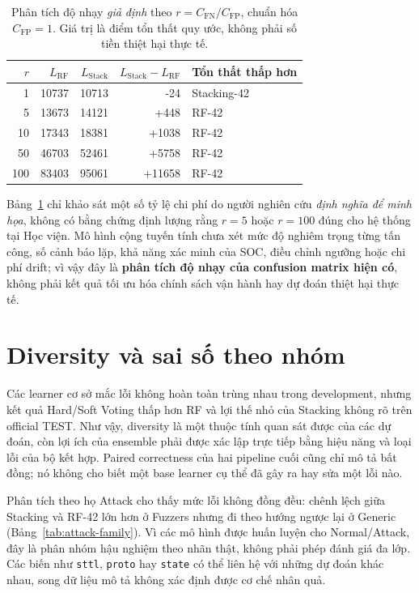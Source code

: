 \begin{table}[htbp]\centering\small
\renewcommand{\arraystretch}{1.23}
\caption{Phân tích độ nhạy \emph{giả định} theo $r=C_{\mathrm{FN}}/C_{\mathrm{FP}}$, chuẩn hóa $C_{\mathrm{FP}}=1$. Giá trị là điểm tổn thất quy ước, không phải số tiền thiệt hại thực tế.}
\label{tab:v4-cost-sensitivity}
\begin{tabular}{rrrrl}\toprule
$r$ & $L_{\mathrm{RF}}$ & $L_{\mathrm{Stack}}$ & $L_{\mathrm{Stack}}-L_{\mathrm{RF}}$ & Tổn thất thấp hơn\\\midrule
1 & 10737 & 10713 & -24 & Stacking-42\\
5 & 13673 & 14121 & +448 & RF-42\\
10 & 17343 & 18381 & +1038 & RF-42\\
50 & 46703 & 52461 & +5758 & RF-42\\
100 & 83403 & 95061 & +11658 & RF-42\\\bottomrule
\end{tabular}
\end{table}

Bảng~\ref{tab:v4-cost-sensitivity} chỉ khảo sát một số tỷ lệ chi phí do người nghiên cứu \emph{định nghĩa để minh họa}, không có bằng chứng định lượng rằng $r=5$ hoặc $r=100$ đúng cho hệ thống tại Học viện. Mô hình cộng tuyến tính chưa xét mức độ nghiêm trọng từng tấn công, số cảnh báo lặp, khả năng xác minh của SOC, điều chỉnh ngưỡng hoặc chi phí drift; vì vậy đây là \textbf{phân tích độ nhạy của confusion matrix hiện có}, không phải kết quả tối ưu hóa chính sách vận hành hay dự đoán thiệt hại thực tế.


\section{Diversity và sai số theo nhóm}
\label{sec:discussion-diversity-families}

Các learner cơ sở mắc lỗi không hoàn toàn trùng nhau trong development, nhưng kết quả Hard/Soft Voting thấp hơn RF và lợi thế nhỏ của Stacking không rõ trên official TEST. Như vậy, diversity là một thuộc tính quan sát được của các dự đoán, còn lợi ích của ensemble phải được xác lập trực tiếp bằng hiệu năng và loại lỗi của bộ kết hợp. Paired correctness của hai pipeline cuối cũng chỉ mô tả bất đồng; nó không cho biết một base learner cụ thể đã gây ra hay sửa một lỗi nào.

Phân tích theo họ Attack cho thấy mức lỗi không đồng đều: chênh lệch giữa Stacking và RF-42 lớn hơn ở Fuzzers nhưng đi theo hướng ngược lại ở Generic (Bảng~\ref{tab:attack-family}). Vì các mô hình được huấn luyện cho Normal/Attack, đây là phân nhóm hậu nghiệm theo nhãn thật, không phải phép đánh giá đa lớp. Các biến như \texttt{sttl}, \texttt{proto} hay \texttt{state} có thể liên hệ với những dự đoán khác nhau, song dữ liệu mô tả không xác định được cơ chế nhân quả.

